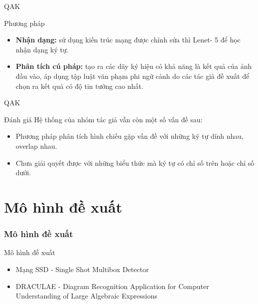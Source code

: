\documentclass{beamer}
\begin{document}
	\begin{frame}{QAK}
		\begin{block}{Phương pháp}
			\begin{itemize}
				\item \textbf{Nhận dạng:} sử dụng kiến trúc mạng được chỉnh sửa thì Lenet- 5 để học nhận dạng ký tự.
				\item \textbf{Phân tích cú pháp:} tạo ra các dãy ký hiệu có khả năng là kết quả của ảnh đầu vào, áp dụng tập luật văn phạm phi ngữ cảnh do các tác giả đề xuất để chọn ra kết quả có độ tin tưởng cao nhất.
			\end{itemize}
		\end{block}
	\end{frame}
	
	\begin{frame}{QAK}
		\begin{block}{Đánh giá}
			Hệ thống của nhóm tác giả vẫn còn một số vấn đề sau:
			\begin{itemize}
				\item Phương pháp phân tích hình chiếu gặp vấn đề với những ký tự dính nhau, overlap nhau.
				\item Chưa giải quyết được với những biểu thức mà ký tự có chỉ số trên hoặc chỉ số dưới. 
			\end{itemize}
		\end{block}
	\end{frame}
	
	
	\section{Mô hình đề xuất}
	\begin{frame}
		\frametitle{Mô hình đề xuất}
		{\Huge Mô hình đề xuất}
		\hspace{10 cm}
		
		\begin{itemize}
			\item Mạng SSD - Single Shot Multibox Detector
			\item DRACULAE - Diagram Recognition Application for Computer Understanding of Large Algebraic Expressions
		\end{itemize}
		
		
		
	\end{frame}
	
\end{document}
